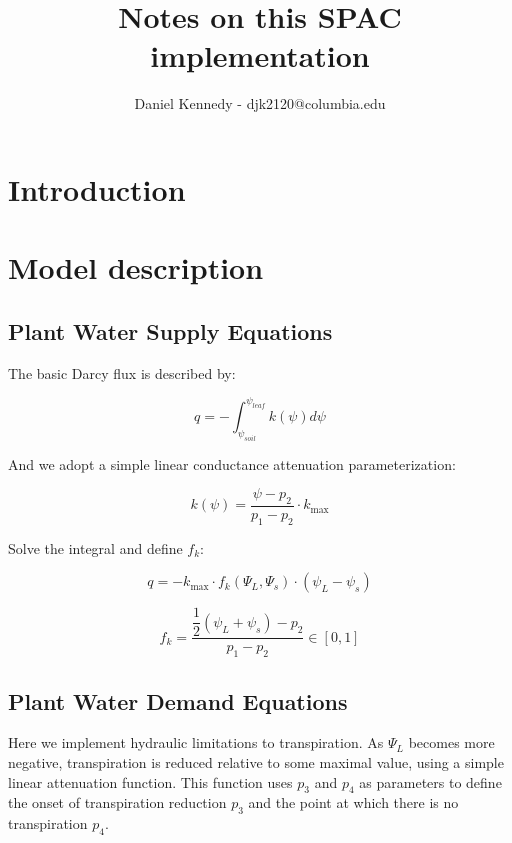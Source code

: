 \documentclass[11pt]{article}
\title{Notes on this SPAC implementation\large}
\author{Daniel Kennedy - djk2120@columbia.edu 
}
\begin{document}
\maketitle

\section{Introduction}

\clearpage
\section{Model description}

\subsection{Plant Water Supply Equations}

The basic Darcy flux is described by:

\begin{equation}
q = -\int_{\psi_{soil}}^{\psi_{leaf}}{k\left(\psi\right)d\psi}
\end{equation}

And we adopt a simple linear conductance attenuation parameterization:

\begin{equation}
k(\psi) = \dfrac{\psi - p_2}{p_1 - p_2} \cdot k_\text{max}
\end{equation}

Solve the integral and define $f_k$:

\begin{equation}
q = -k_\text{max}\cdot f_k\left(\Psi_L,\Psi_s\right) \cdot \left(\psi_L-\psi_s\right)
\end{equation}

\begin{equation}
f_k = \dfrac{\dfrac{1}{2} \left(\psi_L+\psi_s\right) - p_2}{p_1 - p_2} \in \left[0,1\right]
\end{equation}


\clearpage
\subsection{Plant Water Demand Equations}

Here we implement hydraulic limitations to transpiration. As $\Psi_L$ becomes more negative, transpiration is reduced relative to some maximal value, using a simple linear attenuation function. This function uses $p_3$ and $p_4$ as parameters to define the onset of transpiration reduction $p_3$ and the point at which there is no transpiration $p_4$.
\end{document}
